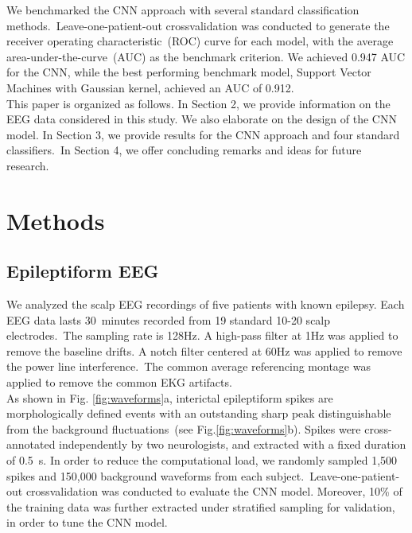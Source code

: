 \documentclass{article}
\begin{document}
We benchmarked the CNN approach with several standard classification methods.~Leave-one-patient-out crossvalidation was conducted to generate the receiver operating characteristic~(ROC) curve for each model, with the average area-under-the-curve~(AUC) as the benchmark criterion. We achieved 0.947 AUC for the CNN, while the best performing benchmark model, Support Vector Machines with Gaussian kernel, achieved an AUC of 0.912.
\\

This paper is organized as follows. In Section 2, we provide information on the EEG data considered in this study. We also elaborate on the design of the CNN model. In Section 3, we provide results for the CNN approach and four standard classifiers.~In Section 4, we offer concluding remarks and ideas for future research. \\

\section{Methods}
\subsection{Epileptiform EEG}
We analyzed the scalp EEG recordings of five patients with known epilepsy. Each EEG data lasts 30~minutes recorded from 19 standard 10-20 scalp electrodes.~The sampling rate is 128Hz. A high-pass filter at 1Hz was applied to remove the baseline drifts. A notch filter centered at 60Hz was applied to remove the power line interference.~The common average referencing montage was applied to remove the common EKG artifacts.\\

As shown in Fig. \ref{fig:waveforms}a, interictal epileptiform spikes are morphologically defined events with an outstanding sharp peak distinguishable from the background fluctuations~(see Fig.\ref{fig:waveforms}b). Spikes were cross-annotated independently by two neurologists, and extracted with a fixed duration of 0.5~s. In order to reduce the computational load, we randomly sampled 1,500 spikes and 150,000 background waveforms from each subject.~Leave-one-patient-out crossvalidation was conducted to evaluate the CNN model. Moreover, 10\% of the training data was further extracted under stratified sampling for validation, in order to tune the CNN model.\\
\end{document}
